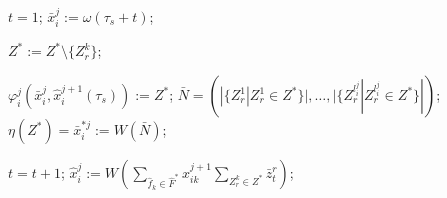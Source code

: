 	\Statex {}
	
	\State $t=1$;
	 \label{alst:cycle_start}
		\State $\bar{x}_i^j:=\omega(\tau_s+t)$;
	
			 \label{alst:update_z}
				\State $Z^*:=Z^*\setminus\{Z_r^k\}$;
			\EndIf
		\EndFor
	
		\State $\varphi_i^j(\bar x_i^j,\hat{x}_i^{j+1}(\tau_s)) := Z^*$; 
		\State $\bar N=(|\{Z_r^1|Z_r^1\in Z^*\}|,\dots,|\{Z_r^{l_i^j}|Z_r^{l_i^j}\in Z^*\}|)$; \label{alst:calc_out1}
		\State $\eta(Z^*)=\bar{x}_i^{*j}:=W(\bar N)$; \label{alst:calc_out3}
	
		\State $t=t+1$;
			\State $\hat{x}_i^j:=W(\sum_{\hat f_k\in\hat F^*}\hat x_{ik}^{j+1}\sum_{Z_r^k\in Z^*}\bar z_t^r)$; \label{alst:calc_state1}
		\EndIf
	\EndWhile \label{alst:cycle_end}